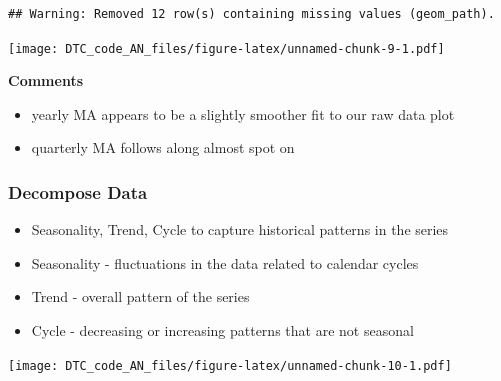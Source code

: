 \documentclass[
]{article}
\newenvironment{Shaded}{\begin{snugshade}}{\end{snugshade}}
\newcommand{\AttributeTok}[1]{\textcolor[rgb]{0.77,0.63,0.00}{#1}}
\newcommand{\CommentTok}[1]{\textcolor[rgb]{0.56,0.35,0.01}{\textit{#1}}}
\newcommand{\DecValTok}[1]{\textcolor[rgb]{0.00,0.00,0.81}{#1}}
\newcommand{\FunctionTok}[1]{\textcolor[rgb]{0.00,0.00,0.00}{#1}}
\newcommand{\NormalTok}[1]{#1}
\newcommand{\OtherTok}[1]{\textcolor[rgb]{0.56,0.35,0.01}{#1}}
\newcommand{\SpecialCharTok}[1]{\textcolor[rgb]{0.00,0.00,0.00}{#1}}
\newcommand{\StringTok}[1]{\textcolor[rgb]{0.31,0.60,0.02}{#1}}
\providecommand{\tightlist}{%
  \setlength{\itemsep}{0pt}\setlength{\parskip}{0pt}}
\begin{document}
\begin{verbatim}
## Warning: Removed 12 row(s) containing missing values (geom_path).
\end{verbatim}

\texttt{[image: DTC\_code\_AN\_files/figure-latex/unnamed-chunk-9-1.pdf]}

\textbf{Comments}

\begin{itemize}
\tightlist
\item
  yearly MA appears to be a slightly smoother fit to our raw data plot
\item
  quarterly MA follows along almost spot on
\end{itemize}

\hypertarget{decompose-data}{%
\subsubsection{Decompose Data}\label{decompose-data}}

\begin{itemize}
\tightlist
\item
  Seasonality, Trend, Cycle to capture historical patterns in the series
\item
  Seasonality - fluctuations in the data related to calendar cycles
\item
  Trend - overall pattern of the series
\item
  Cycle - decreasing or increasing patterns that are not seasonal
\end{itemize}

\begin{Shaded}
\end{Shaded}

\texttt{[image: DTC\_code\_AN\_files/figure-latex/unnamed-chunk-10-1.pdf]}
\end{document}
